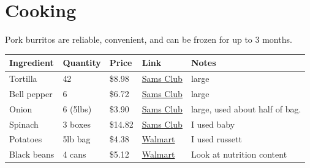 \section{Cooking}

\begin{definition}
  \label{def:pork-burritos}
 
  Pork burritos are reliable, convenient, and can be frozen for up to 3 months. 
  
  \begin{table}[H]
    \centering
    \begin{tabular}{|l|l|l|l|l|}
      \hline
      \textbf{Ingredient} & \textbf{Quantity} & \textbf{Price} & \textbf{Link} & \textbf{Notes} \\
      \hline
      Tortilla & 42 & \$8.98 & \href{https://www.samsclub.com/ip/Mission-10-Burrito-Flour-Tortillas-40-ct/13619860613?athcpid=13619860613&athpgid=MyItemsPage&athcgid=null&athznid=MyItems&athieid=v0&athstid=CS020&athguid=69RMVpmE-l46-lSvIvT3EAfvIl4kCnT9QU7p&athancid=null&athena=true}{Sams Club} & large\\ 
      Bell pepper & 6 & \$6.72 & \href{https://www.samsclub.com/ip/Multi-Bell-Sweet-Peppers-6-ct/13617010302?athcpid=13617010302&athpgid=MyItemsPage&athcgid=null&athznid=MyItems&athieid=v0&athstid=CS020&athguid=69RMVpmE-l46-lSvIvT3EAfvIl4kCnT9QU7p&athancid=null&athena=true}{Sams Club} & large\\
      Onion & 6 (5lbs) & \$3.90 & \href{https://www.samsclub.com/ip/Yellow-Onions-10-lbs/13599313206?athcpid=13599313206&athpgid=MyItemsPage&athcgid=null&athznid=MyItems&athieid=v0&athstid=CS020&athguid=69RMVpmE-l46-lSvIvT3EAfvIl4kCnT9QU7p&athancid=null&athena=true}{Sams Club} & large, used about half of bag. \\
      Spinach & 3 boxes & \$14.82 & \href{https://www.samsclub.com/ip/Organic-Baby-Spinach-16-oz/13803520057?athcpid=13803520057&athpgid=MyItemsPage&athcgid=null&athznid=MyItems&athieid=v0&athstid=CS020&athguid=69RMVpmE-l46-lSvIvT3EAfvIl4kCnT9QU7p&athancid=null&athena=true}{Sams Club} & I used baby\\
      Potatoes & 5lb bag & \$4.38 & \href{https://www.walmart.com/ip/Fresh-Whole-Russet-Potatoes-5lb-bag/10447837?classType=REGULAR&athbdg=L1200&from=/search}{Walmart} & I used russett \\
      Black beans & 4 cans & \$5.12 & \href{https://www.walmart.com/ip/Bush-s-Reduced-Sodium-Black-Beans-15-oz-Can/12166525}{Walmart} & Look at nutrition content\\

\end{tabular}
\end{table}
\end{definition}
